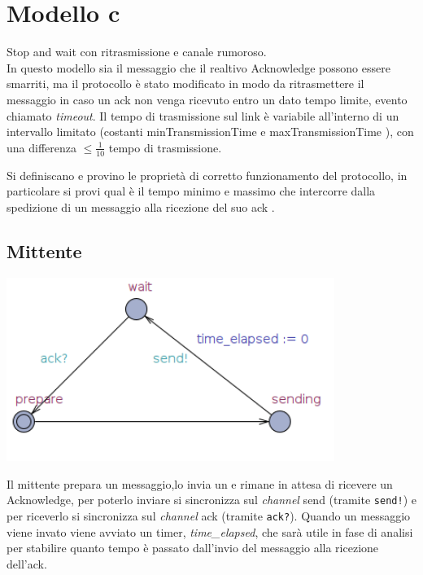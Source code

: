 \documentclass[a4paper]{article}
\newcommand{\channel}{\textit{channel }}
\begin{document}
\section{Modello c}
Stop and wait con ritrasmissione e canale rumoroso.\\
In questo modello sia il messaggio che il realtivo Acknowledge possono essere smarriti, ma il protocollo è stato modificato in modo da ritrasmettere il messaggio in caso un ack non venga ricevuto entro un dato tempo limite, evento chiamato \textit{timeout}.
Il tempo di trasmissione sul link è variabile all’interno di un intervallo limitato (costanti minTransmissionTime e maxTransmissionTime ), con una differenza $\leq \frac{1}{10}$ tempo di trasmissione.

Si definiscano e provino le proprietà di corretto funzionamento del protocollo, in particolare si provi qual è il tempo minimo e massimo che intercorre dalla spedizione di un messaggio alla ricezione del suo ack .
\subsection{Mittente}
\begin{center}\includegraphics[width=0.8\textwidth]{1_sender.png}\end{center}
Il mittente prepara un messaggio,lo invia un e rimane in attesa di ricevere un Acknowledge, per poterlo inviare si sincronizza sul \channel send (tramite \texttt{send!}) e per riceverlo si sincronizza sul \channel ack (tramite \texttt{ack?}).
Quando un messaggio viene invato viene avviato un timer, \textit{time\_elapsed}, che sarà utile in fase di analisi per stabilire quanto tempo è passato dall'invio del messaggio alla ricezione dell'ack.
\end{document}
